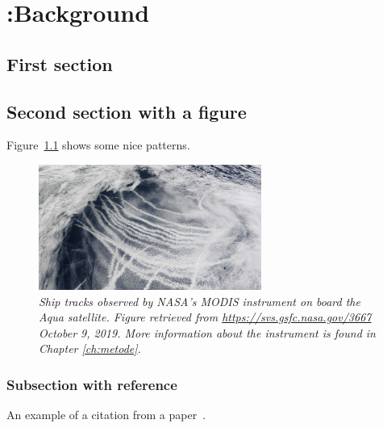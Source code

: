 \chapter[Background]{{\color{red} :}Background}
%
\label{ch:background}

\section{First section}\label{ch:forcefeed}

\kant[3]

\section{Second section with a figure}

Figure~\ref{fig:shiptracks} shows some nice patterns.

\begin{figure}
\centering
    \includegraphics[width=0.65\textwidth]{figurer/ship_tracks.jpg}
\caption{\textit{Ship tracks observed by NASA's MODIS instrument on board the Aqua satellite. Figure retrieved from \url{https://svs.gsfc.nasa.gov/3667} October 9, 2019. More information about the instrument is found in Chapter \ref{ch:metode}.}}
\label{fig:shiptracks}
\end{figure}

\subsection{Subsection with reference}
\label{sec:ex:cite}

An example of a citation from a paper~\cite{glasius_composition_2018}.

